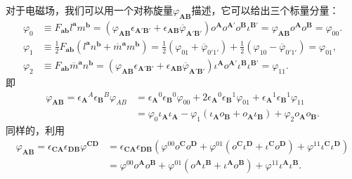 对于电磁场，我们可以用一个对称旋量$\varphi _{\boldsymbol{AB}}$描述，它可以给出三个标量分量：
\begin{equation*}
	\begin{aligned}
		\varphi _{0} & \equiv F_{\boldsymbol{ab}} l^{\boldsymbol{a}} m^{\boldsymbol{b}} =(\varphi _{\boldsymbol{AB}} \epsilon _{\boldsymbol{A} '\boldsymbol{B} '} +\epsilon _{\boldsymbol{AB}}\overline{\varphi }_{\boldsymbol{A} '\boldsymbol{B} '} )o^{\boldsymbol{A}} o^{\boldsymbol{A} '} o^{\boldsymbol{B}} \iota ^{\boldsymbol{B} '} =\varphi _{\boldsymbol{AB}} o^{\boldsymbol{A}} o^{\boldsymbol{B}} =\varphi _{00} .\\
		\varphi _{1} & \equiv \frac{1}{2} F_{\boldsymbol{ab}} (l^{\boldsymbol{a}} n^{\boldsymbol{b}} +\overline{m}^{\boldsymbol{a}} m^{\boldsymbol{b}} )=\frac{1}{2} (\varphi _{01} +\overline{\varphi }_{0'1'}) +\frac{1}{2} (\varphi _{10} -\overline{\varphi }_{0'1'} )=\varphi _{01} ,\\
		\varphi _{2} & \equiv F_{\boldsymbol{ab}}\overline{m}^{\boldsymbol{a}} n^{\boldsymbol{b}} =(\varphi _{\boldsymbol{AB}} \epsilon _{\boldsymbol{A} '\boldsymbol{B} '} +\epsilon _{\boldsymbol{AB}}\overline{\varphi }_{\boldsymbol{A} '\boldsymbol{B} '} )\iota ^{\boldsymbol{A}} o^{\boldsymbol{A} '} \iota ^{\boldsymbol{B}} \iota ^{\boldsymbol{B} '} =\varphi _{11} .
	\end{aligned}
\end{equation*}
即
\begin{equation*}
	\begin{aligned}
		\varphi _{\boldsymbol{AB}} =\epsilon {_{\boldsymbol{A}}}^{A} \epsilon {_{\boldsymbol{B}}}^{B} \varphi _{AB} & =\epsilon {_{\boldsymbol{A}}}^{0} \epsilon {_{\boldsymbol{B}}}^{0} \varphi _{00} +2\epsilon {_{\boldsymbol{A}}}^{0} \epsilon {_{\boldsymbol{B}}}^{1} \varphi _{01} +\epsilon {_{\boldsymbol{A}}}^{1} \epsilon {_{\boldsymbol{B}}}^{1} \varphi _{11}\\
		& =\varphi _{0} \iota _{\boldsymbol{A}} \iota _{\boldsymbol{A}} -\varphi _{1}( \iota _{\boldsymbol{A}} o_{\boldsymbol{B}} +o_{\boldsymbol{A}} \iota _{\boldsymbol{B}}) +\varphi _{2} o_{\boldsymbol{A}} o_{\boldsymbol{B}} .
	\end{aligned}
\end{equation*}
同样的，利用
\begin{equation*}
	\begin{aligned}
		\varphi _{\boldsymbol{AB}} =\epsilon _{\boldsymbol{CA}} \epsilon _{\boldsymbol{DB}} \varphi ^{\boldsymbol{CD}} & =\epsilon _{\boldsymbol{CA}} \epsilon _{\boldsymbol{DB}} (\varphi ^{00} o^{\boldsymbol{C}} o^{\boldsymbol{D}} +\varphi ^{01} (o^{\boldsymbol{C}} \iota ^{\boldsymbol{D}} +\iota ^{\boldsymbol{C}} o^{\boldsymbol{D}} )+\varphi ^{11} \iota ^{\boldsymbol{C}} \iota ^{\boldsymbol{D}} )\\
		& =\varphi ^{00} o^{\boldsymbol{A}} o^{\boldsymbol{B}} +\varphi ^{01} (o^{\boldsymbol{A}} \iota ^{\boldsymbol{B}} +\iota ^{\boldsymbol{A}} o^{\boldsymbol{B}} )+\varphi ^{11} \iota ^{\boldsymbol{A}} \iota ^{\boldsymbol{B}} .
	\end{aligned}
\end{equation*}
